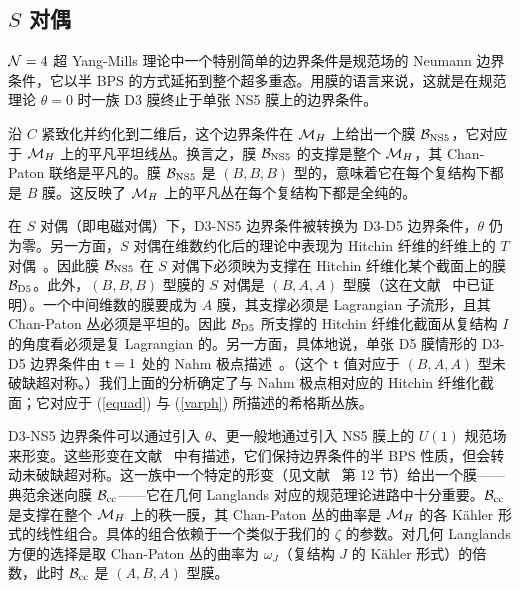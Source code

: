 \subsection{$S$ 对偶}\label{sduality}

${\mathcal N}=4$ 超 Yang-Mills 理论中一个特别简单的边界条件是规范场的 Neumann 边界条件，它以半 BPS 的方式延拓到整个超多重态。用膜的语言来说，这就是在规范理论 $\theta=0$ 时一族 D3 膜终止于单张 NS5 膜上的边界条件。

沿 $C$ 紧致化并约化到二维后，这个边界条件在 ${\mathcal M}_H$ 上给出一个膜 $\B_{\NS5}$，它对应于 ${\mathcal M}_H$ 上的平凡平坦线丛。换言之，膜 $\B_{\NS5}$ 的支撑是整个 ${\mathcal M}_H$，其 Chan-Paton 联络是平凡的。膜 $\B_{\NS5}$ 是 $(B,B,B)$ 型的，意味着它在每个复结构下都是 $B$ 膜。这反映了 ${\mathcal M}_H$ 上的平凡丛在每个复结构下都是全纯的。

在 $S$ 对偶（即电磁对偶）下，D3-NS5 边界条件被转换为 D3-D5 边界条件，$\theta$ 仍为零。另一方面，$S$ 对偶在维数约化后的理论中表现为 Hitchin 纤维的纤维上的 $T$ 对偶~\cite{BVJ,HM}。因此膜 $\B_{\NS5}$ 在 $S$ 对偶下必须映为支撑在 Hitchin 纤维化某个截面上的膜 ${\B}_{\uD5}$。此外，$(B,B,B)$ 型膜的 $S$ 对偶是 $(B,A,A)$ 型膜（这在文献~\cite{KW} 中已证明）。一个中间维数的膜要成为 $A$ 膜，其支撑必须是 Lagrangian 子流形，且其 Chan-Paton 丛必须是平坦的。因此 $\B_{\uD5}$ 所支撑的 Hitchin 纤维化截面从复结构 $I$ 的角度看必须是复 Lagrangian 的。另一方面，具体地说，单张 D5 膜情形的 D3-D5 边界条件由 ${ \sf t}=1$ 处的 Nahm 极点描述~\cite{gw}。（这个 ${ \sf t}$ 值对应于 $(B,A,A)$ 型未破缺超对称。）我们上面的分析确定了与 Nahm 极点相对应的 Hitchin 纤维化截面；它对应于 (\ref{equad}) 与 (\ref{varph}) 所描述的希格斯丛族。


D3-NS5 边界条件可以通过引入 $\theta$、更一般地通过引入 NS5 膜上的 $U(1)$ 规范场来形变。这些形变在文献~\cite{gw} 中有描述，它们保持边界条件的半 BPS 性质，但会转动未破缺超对称。这一族中一个特定的形变（见文献~\cite{KW} 第 12 节）给出一个膜——典范余迷向膜 ${\mathcal B_{\mathrm{cc}}}$——它在几何 Langlands 对应的规范理论进路中十分重要。${\mathcal B_{\mathrm{cc}}}$ 是支撑在整个 ${\mathcal M}_H$ 上的秩一膜，其 Chan-Paton 丛的曲率是 ${\mathcal M}_H$ 的各 Kähler 形式的线性组合。具体的组合依赖于一个类似于我们的 $\zeta$ 的参数。对几何 Langlands 方便的选择是取 Chan-Paton 丛的曲率为 $\omega_J$（复结构 $J$ 的 Kähler 形式）的倍数，此时 ${\mathcal B_{\mathrm{cc}}}$ 是 $(A,B,A)$ 型膜。


